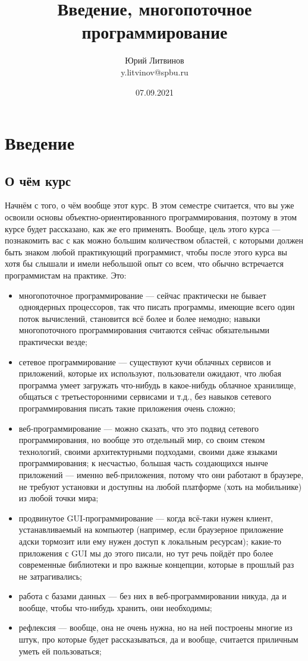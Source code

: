 \documentclass[a5paper]{article}
\title{Введение, многопоточное программирование}
\author{Юрий Литвинов\\\small{y.litvinov@spbu.ru}}
\date{07.09.2021}
\begin{document}
\maketitle
\thispagestyle{empty}

\section{Введение}

\subsection{О чём курс}

Начнём с того, о чём вообще этот курс. В этом семестре считается, что вы уже освоили основы объектно-ориентированного программирования, поэтому в этом курсе будет рассказано, как же его применять. Вообще, цель этого курса --- познакомить вас с как можно большим количеством областей, с которыми должен быть знаком любой практикующий программист, чтобы после этого курса вы хотя бы слышали и имели небольшой опыт со всем, что обычно встречается программистам на практике. Это:

\begin{itemize}
    \item многопоточное программирование --- сейчас практически не бывает одноядерных процессоров, так что писать программы, имеющие всего один поток вычислений, становится всё более и более немодно; навыки многопоточного программирования считаются сейчас обязательными практически везде;
    \item сетевое программирование --- существуют кучи облачных сервисов и приложений, которые их используют, пользователи ожидают, что любая программа умеет загружать что-нибудь в какое-нибудь облачное хранилище, общаться с третьесторонними сервисами и т.д., без навыков сетевого программирования писать такие приложения очень сложно;
    \item веб-программирование --- можно сказать, что это подвид сетевого программирования, но вообще это отдельный мир, со своим стеком технологий, своими архитектурными подходами, своими даже языками программирования; к несчастью, большая часть создающихся нынче приложений --- именно веб-приложения, потому что они работают в браузере, не требуют установки и доступны на любой платформе (хоть на мобильнике) из любой точки мира;
    \item продвинутое GUI-программирование --- когда всё-таки нужен клиент, устанавливаемый на компьютер (например, если браузерное приложение адски тормозит или ему нужен доступ к локальным ресурсам); какие-то приложения с GUI мы до этого писали, но тут речь пойдёт про более современные библиотеки и про важные концепции, которые в прошлый раз не затрагивались;
    \item работа с базами данных --- без них в веб-программировании никуда, да и вообще, чтобы что-нибудь хранить, они необходимы;
    \item рефлексия --- вообще, она не очень нужна, но на ней построены многие из штук, про которые будет рассказываться, да и вообще, считается приличным уметь ей пользоваться;
\end{itemize}
\end{document}
